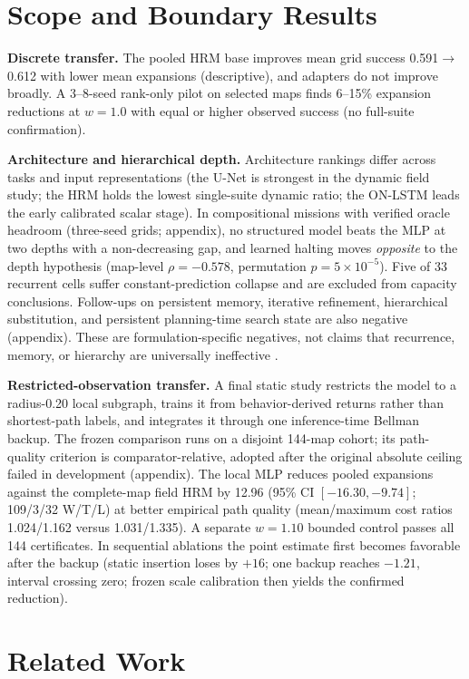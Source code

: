 \documentclass[letterpaper]{article} %
\begin{document}
\section{Scope and Boundary Results}

\textbf{Discrete transfer.} The pooled HRM base improves mean grid success 0.591$\to$0.612 with lower mean expansions (descriptive), and adapters do not improve broadly. A 3--8-seed rank-only pilot on selected maps finds 6--15\% expansion reductions at $w{=}1.0$ with equal or higher observed success (no full-suite confirmation).

\textbf{Architecture and hierarchical depth.} Architecture rankings differ across tasks and input representations (the U-Net is strongest in the dynamic field study; the HRM holds the lowest single-suite dynamic ratio; the ON-LSTM leads the early calibrated scalar stage). In compositional missions with verified oracle headroom (three-seed grids; appendix), no structured model beats the MLP at two depths with a non-decreasing gap, and learned halting moves \emph{opposite} to the depth hypothesis (map-level $\rho{=}-0.578$, permutation $p{=}5\times10^{-5}$). Five of 33 recurrent cells suffer constant-prediction collapse and are excluded from capacity conclusions. Follow-ups on persistent memory, iterative refinement, hierarchical substitution, and persistent planning-time search state are also negative (appendix). These are formulation-specific negatives, not claims that recurrence, memory, or hierarchy are universally ineffective \citep{jolicoeur2025trm,czechowski2021subgoal}.

\textbf{Restricted-observation transfer.} A final static study restricts the model to a radius-0.20 local subgraph, trains it from behavior-derived returns rather than shortest-path labels, and integrates it through one inference-time Bellman backup. The frozen comparison runs on a disjoint 144-map cohort; its path-quality criterion is comparator-relative, adopted after the original absolute ceiling failed in development (appendix). The local MLP reduces pooled expansions against the complete-map field HRM by 12.96 (95\% CI $[-16.30,-9.74]$; 109/3/32 W/T/L) at better empirical path quality (mean/maximum cost ratios 1.024/1.162 versus 1.031/1.335). A separate $w{=}1.10$ bounded control passes all 144 certificates. In sequential ablations the point estimate first becomes favorable after the backup (static insertion loses by $+16$; one backup reaches $-1.21$, interval crossing zero; frozen scale calibration then yields the confirmed reduction).
\section{Related Work}
\end{document}
